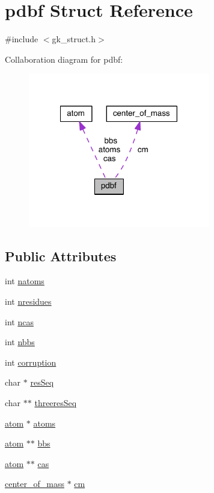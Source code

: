 \hypertarget{a00666}{}\section{pdbf Struct Reference}
\label{a00666}


{\ttfamily \#include $<$gk\+\_\+struct.\+h$>$}



Collaboration diagram for pdbf\+:\nopagebreak
\begin{figure}[H]
\begin{center}
\leavevmode
\includegraphics[width=225pt]{a00664}
\end{center}
\end{figure}
\subsection*{Public Attributes}
\begin{DoxyCompactItemize}
\item 
int \hyperlink{a00666_a6752def7d72ee73480a9fad514e60aef}{natoms}
\item 
int \hyperlink{a00666_a4172474fbba5b2127ab8e3184c63a059}{nresidues}
\item 
int \hyperlink{a00666_a7d28e61b01058ba61fb34b7b4b50e044}{ncas}
\item 
int \hyperlink{a00666_a9d9dbad94b94f067e3ab58334c9e892f}{nbbs}
\item 
int \hyperlink{a00666_af233eba06a2f4916dc76af49e447a013}{corruption}
\item 
char $\ast$ \hyperlink{a00666_a6be2fde75925c5a1064dfecd700dc79f}{res\+Seq}
\item 
char $\ast$$\ast$ \hyperlink{a00666_a2d79aa1e5f0634b5e4ceb22d1b2f2462}{threeres\+Seq}
\item 
\hyperlink{a00658}{atom} $\ast$ \hyperlink{a00666_aa582271e2b7d1d659f86ee27846d7a96}{atoms}
\item 
\hyperlink{a00658}{atom} $\ast$$\ast$ \hyperlink{a00666_af61e2b265a60d64feed10fd0ab7258a2}{bbs}
\item 
\hyperlink{a00658}{atom} $\ast$$\ast$ \hyperlink{a00666_a8fe8603ea76642263584103b2f574306}{cas}
\item 
\hyperlink{a00662}{center\+\_\+of\+\_\+mass} $\ast$ \hyperlink{a00666_a2124a322f26cb63ebaebe107a55c6f17}{cm}
\end{DoxyCompactItemize}


